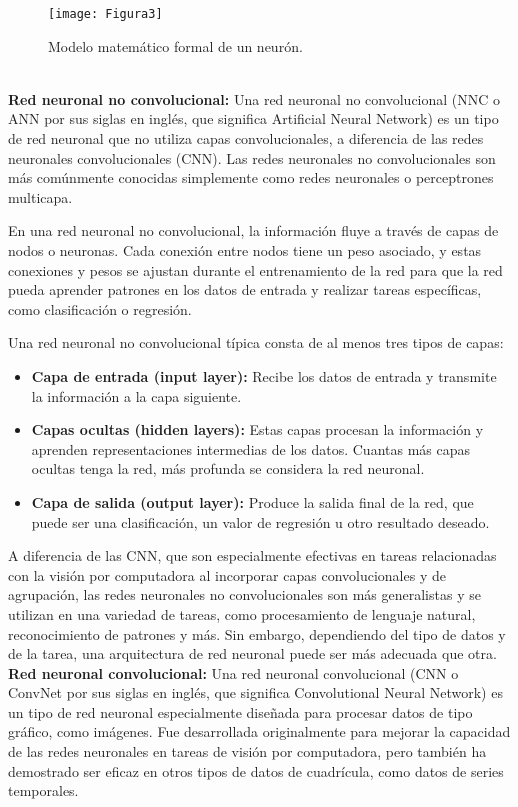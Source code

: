 \documentclass[a4paper,
               ]{jacow}
\begin{document}
\begin{figure}[!htb]
   \centering
   \captionsetup{justification=centering}
    \texttt{[image: Figura3]}
    \caption{Modelo matemático formal de un neurón.}
\end{figure}
\\
\textbf{Red neuronal no convolucional:} Una red neuronal no convolucional (NNC o ANN por sus siglas en inglés, que significa Artificial Neural Network) es un tipo de red neuronal que no utiliza capas convolucionales, a diferencia de las redes neuronales convolucionales (CNN). Las redes neuronales no convolucionales son más comúnmente conocidas simplemente como redes neuronales o perceptrones multicapa.

En una red neuronal no convolucional, la información fluye a través de capas de nodos o neuronas. Cada conexión entre nodos tiene un peso asociado, y estas conexiones y pesos se ajustan durante el entrenamiento de la red para que la red pueda aprender patrones en los datos de entrada y realizar tareas específicas, como clasificación o regresión.

Una red neuronal no convolucional típica consta de al menos tres tipos de capas:
\begin{itemize}
    \item \textbf{Capa de entrada (input layer):} Recibe los datos de entrada y transmite la información a la capa siguiente. 
    \item \textbf{Capas ocultas (hidden layers):} Estas capas procesan la información y aprenden representaciones intermedias de los datos. Cuantas más capas ocultas tenga la red, más profunda se considera la red neuronal. 
    \item \textbf{Capa de salida (output layer):} Produce la salida final de la red, que puede ser una clasificación, un valor de regresión u otro resultado deseado. 
\end{itemize}
A diferencia de las CNN, que son especialmente efectivas en tareas relacionadas con la visión por computadora al incorporar capas convolucionales y de agrupación, las redes neuronales no convolucionales son más generalistas y se utilizan en una variedad de tareas, como procesamiento de lenguaje natural, reconocimiento de patrones y más. Sin embargo, dependiendo del tipo de datos y de la tarea, una arquitectura de red neuronal puede ser más adecuada que otra. 
\\
\textbf{Red neuronal convolucional:} Una red neuronal convolucional (CNN o ConvNet por sus siglas en inglés, que significa Convolutional Neural Network) es un tipo de red neuronal especialmente diseñada para procesar datos de tipo gráfico, como imágenes. Fue desarrollada originalmente para mejorar la capacidad de las redes neuronales en tareas de visión por computadora, pero también ha demostrado ser eficaz en otros tipos de datos de cuadrícula, como datos de series temporales.
\end{document}
